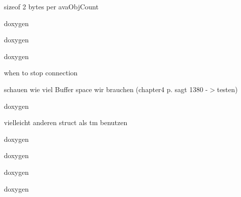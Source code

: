 \begin{DoxyRefList}
\label{todo__todo000006}%
%
sizeof 2 bytes per ava\+Obj\+Count  
\item[Member \doxylink{class_socket_client_a7489e003d18ad052bdbf385dc2b1bcc7}{Socket\+Client\+::Decode\+Observation\+Poll\+Objects} (\doxylink{struct_observation_poll}{Observation\+Poll} \texorpdfstring{$\ast$}{*}scpoll, char \texorpdfstring{$\ast$}{*}buffer)]\label{todo__todo000036}%
%
doxygen  
\item[Member \doxylink{class_socket_client_afe5e218da3078eaaff6a522d8f1ac98a}{Socket\+Client\+::Decode\+Poll\+Objects} (\doxylink{struct_poll_info_list}{Poll\+Info\+List} \texorpdfstring{$\ast$}{*}pollobjects, char \texorpdfstring{$\ast$}{*}packetbuffer)]\label{todo__todo000037}%
%
doxygen  
\item[Member \doxylink{class_socket_client_acb7b543430d602fb8a47bcf122aaebe4}{Socket\+Client\+::Decode\+Single\+Context\+Poll\+Objects} (\doxylink{struct_single_context_poll}{Single\+Context\+Poll} \texorpdfstring{$\ast$}{*}scpoll, char \texorpdfstring{$\ast$}{*}buffer)]\label{todo__todo000035}%
%
doxygen  
\item[Member \doxylink{class_socket_client_ae3962f762b411e9b4bf06be013c3c9f1}{Socket\+Client\+::establish\+Lan\+Connection} ()]\label{todo__todo000045}%
%
when to stop connection 

\label{todo__todo000044}%
%
schauen wie viel Buffer space wir brauchen (chapter4 p. sagt 1380 -\/\texorpdfstring{$>$}{>}testen)  
\item[Member \doxylink{class_socket_client_a0168710b16154dfa3e3db26fd692a714}{Socket\+Client\+::Get\+Absolute\+Time\+From\+BCDFormat} (char \texorpdfstring{$\ast$}{*}bcdtimebuffer)]\label{todo__todo000008}%
%
doxygen 

\label{todo__todo000009}%
%
vielleicht anderen struct als tm benutzen  
\item[Member \doxylink{class_socket_client_a87c59fc9d711a6892ccd0a0320d7c74e}{Socket\+Client\+::Get\+Absolute\+Time\+From\+Relative\+Timestamp} (uint32\+\_\+t current\+Relative\+Time)]\label{todo__todo000012}%
%
doxygen  
\item[Member \doxylink{class_socket_client_ae5ba70a270d42bf9745e79497cefa8fe}{Socket\+Client\+::Get\+Baseline\+Relative\+Timestamp} (char \texorpdfstring{$\ast$}{*}timebuffer)]\label{todo__todo000007}%
%
doxygen  
\item[Member \doxylink{class_socket_client_a9d241186d44672699d1a7b536a7fa67a}{Socket\+Client\+::Get\+Packet\+Timestamp} (char \texorpdfstring{$\ast$}{*}header, uint16\+\_\+t headersize)]\label{todo__todo000011}%
%
doxygen  
\item[Member \doxylink{class_socket_client_a67172065a09c78492f4635bea8e1a678}{Socket\+Client\+::Poll\+Packet\+Decoder} (char \texorpdfstring{$\ast$}{*}packetbuffer, size\+\_\+t headersize)]\label{todo__todo000014}%
%
doxygen 


\end{DoxyRefList}
